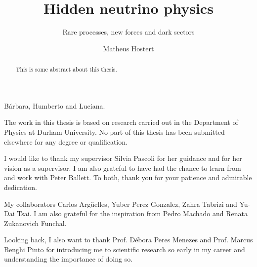 \documentclass[openany,twoside,frontopenright,chaprunninghead]{ip3thesis}
\begin{document}
\title{Hidden neutrino physics}
\subtitle{Rare processes, new forces and dark sectors}
\author{Matheus Hostert}
\maketitlepage*

\begin{abstract}
%
	This is some abstract about this thesis.
%
\end{abstract}


\begin{dedication*}
%
B\'arbara, Humberto and Luciana.
%
\end{dedication*}

\disableprotrusion
\tableofcontents*
\listoffigures
\listoftables
\enableprotrusion

\begin{declaration*}
%
	The work in this thesis is based on research carried out in the Department of
	Physics at Durham University. No part of this thesis has been
	submitted elsewhere for any degree or qualification.
%
\end{declaration*}

\begin{acknowledgements*}

	I would like to thank my supervisor Silvia Pascoli for her guidance and for her vision as a supervisor. I am also grateful to have had the chance to learn from and work with Peter Ballett. To both, thank you for your patience and admirable dedication.

	My collaborators Carlos Arg\"uelles, Yuber Perez Gonzalez, Zahra Tabrizi and Yu-Dai Tsai. I am also grateful for the inspiration from Pedro Machado and Renata Zukanovich Funchal.

	
	Looking back, I also want to thank Prof. D\'ebora Peres Menezes and Prof. Marcus Benghi Pinto for introducing me to scientific research so early in my career and understanding the importance of doing so. 
	
\end{acknowledgements*}



\cleardoublepage

\begin{epigraph*}
% 
% 
\end{epigraph*} 
\end{document}
